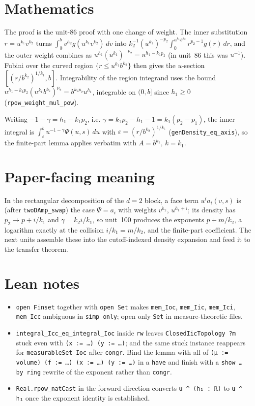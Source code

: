 \documentclass[11pt]{article}
\begin{document}
\section{Mathematics}

The proof is the unit-86 proof with one change of weight. The inner substitution
$r=u^{k_1}v^{k_2}$ turns $\int_0^bv^{h_2}g(u^{k_1}v^{k_2})\,dv$ into
$k_2^{-1}(u^{k_1})^{-p_2}\int_0^{u^{k_1}b^{k_2}}r^{p_2-1}g(r)\,dr$, and the outer weight combines as
$u^{h_1}(u^{k_1})^{-p_2}=u^{h_1-k_1p_2}$ (in unit~86 this was $u^{-1}$). Fubini over the curved
region $\{r\le u^{k_1}b^{k_2}\}$ then gives the $u$-section $[(r/b^{k_2})^{1/k_1},b]$. Integrability
of the region integrand uses the bound $u^{h_1-k_1p_2}(u^{k_1}b^{k_2})^{p_2}=b^{k_2p_2}u^{h_1}$,
integrable on $(0,b]$ since $h_1\ge0$ (\texttt{rpow\_weight\_mul\_pow}).

Writing $-1-\gamma=h_1-k_1p_2$, i.e. $\gamma=k_1p_2-h_1-1=k_1(p_2-p_1)$, the inner integral is
$\int_\varepsilon^bu^{-1-\gamma}\Psi(u,s)\,du$ with $\varepsilon=(r/b^{k_2})^{1/k_1}$
(\texttt{genDensity\_eq\_axis}), so the finite-part lemma applies verbatim with $A=b^{k_2}$,
$k=k_1$.

\section{Paper-facing meaning}

In the rectangular decomposition of the $d=2$ block, a face term $u^ia_i(v,s)$ is (after
\texttt{twoDAmp\_swap}) the case $\Psi=a_i$ with weights $v^{h_2}$, $u^{h_1+i}$; its density has
$p_2\to p+i/k_1$ and $\gamma=k_2i/k_1$, so unit~100 produces the exponents $p+m/k_2$, a logarithm
exactly at the collision $i/k_1=m/k_2$, and the finite-part coefficient. The next units assemble
these into the cutoff-indexed density expansion and feed it to the transfer theorem.

\section{Lean notes}

\begin{itemize}
\item \texttt{open Finset} together with \texttt{open Set} makes \texttt{mem\_Ioc},
\texttt{mem\_Iic}, \texttt{mem\_Ici}, \texttt{mem\_Icc} ambiguous in \texttt{simp only}; open only
\texttt{Set} in measure-theoretic files.
\item \texttt{integral\_Icc\_eq\_integral\_Ioc} inside \texttt{rw} leaves
\texttt{ClosedIicTopology ?m} stuck even with \texttt{(x := …) (y := …)}; and the same stuck
instance reappears for \texttt{measurableSet\_Ioc} after \texttt{congr}. Bind the lemma with all of
\texttt{(μ := volume) (f := …) (x := …) (y := …)} in a \texttt{have} and finish with a
\texttt{show … by ring} rewrite of the exponent rather than \texttt{congr}.
\item \texttt{Real.rpow\_natCast} in the forward direction converts \texttt{u \^{} (h₁ : ℝ)} to
\texttt{u \^{} h₁} once the exponent identity is established.
\end{itemize}
\end{document}
